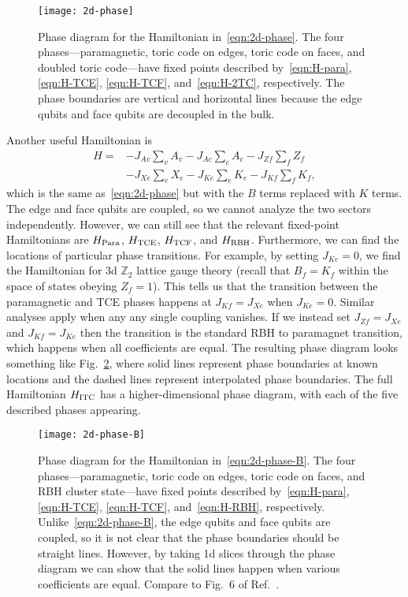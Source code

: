\begin{figure}[ht!]
    \centering
    \texttt{[image: 2d-phase]}
    \caption[Phase diagram for the Hamiltonian in~\eqref{eqn:2d-phase}]{Phase diagram for the Hamiltonian in~\eqref{eqn:2d-phase}. The four phases---paramagnetic, toric code on edges, toric code on faces, and doubled toric code---have fixed points described by~\eqref{eqn:H-para}, \eqref{eqn:H-TCE}, \eqref{eqn:H-TCF}, and~\eqref{eqn:H-2TC}, respectively. The phase boundaries are vertical and horizontal lines because the edge qubits and face qubits are decoupled in the bulk.}
    \label{fig:2d-phase}
\end{figure}

Another useful Hamiltonian is
\begin{align}
H = &- J_{Av} \sum_v A_v - J_{Ac} \sum_c A_c - J_{Zf} \sum_f Z_f \nonumber\\
& - J_{Xe} \sum_e X_e - J_{Ke} \sum_e K_e - J_{Kf} \sum_f K_f, \label{eqn:2d-phase-B}
\end{align}
which is the same as~\eqref{eqn:2d-phase} but with the $B$ terms replaced with $K$ terms. The edge and face qubits are coupled, so we cannot analyze the two sectors independently. However, we can still see that the relevant fixed-point Hamiltonians are $H_{\text{Para}}$, $H_{\text{TCE}}$, $H_{\text{TCF}}$, and $H_{\text{RBH}}$. Furthermore, we can find the locations of particular phase transitions. For example, by setting $J_{Ke}=0$, we find the Hamiltonian for 3d $\mathbb{Z}_2$ lattice gauge theory (recall that $B_f=K_f$ within the space of states obeying $Z_f=1$). This tells us that the transition between the paramagnetic and TCE phases happens at $J_{Kf}=J_{Xe}$ when $J_{Ke}=0$. Similar analyses apply when any any single coupling vanishes. If we instead set $J_{Zf}=J_{Xe}$ and $J_{Kf}=J_{Ke}$ then the transition is the standard RBH to paramagnet transition, which happens when all coefficients are equal. The resulting phase diagram looks something like Fig.~\ref{fig:2d-phase-B}, where solid lines represent phase boundaries at known locations and the dashed lines represent interpolated phase boundaries. 
The full Hamiltonian $H_{\text{ITC}}$ has a higher-dimensional phase diagram, with each of the five described phases appearing.

\begin{figure}[th!]
    \centering
    \texttt{[image: 2d-phase-B]}
    \caption[Phase diagram for the Hamiltonian in~\eqref{eqn:2d-phase-B}]{Phase diagram for the Hamiltonian in~\eqref{eqn:2d-phase-B}. The four phases---paramagnetic, toric code on edges, toric code on faces, and RBH cluster state---have fixed points described by~\eqref{eqn:H-para}, \eqref{eqn:H-TCE}, \eqref{eqn:H-TCF}, and~\eqref{eqn:H-RBH}, respectively. Unlike~\eqref{eqn:2d-phase-B}, the edge qubits and face qubits are coupled, so it is not clear that the phase boundaries should be straight lines. However, by taking 1d slices through the phase diagram we can show that the solid lines happen when various coefficients are equal. Compare to Fig.~6 of Ref.~\cite{Li2023PhaseDiagram}.}
    \label{fig:2d-phase-B}
\end{figure}

